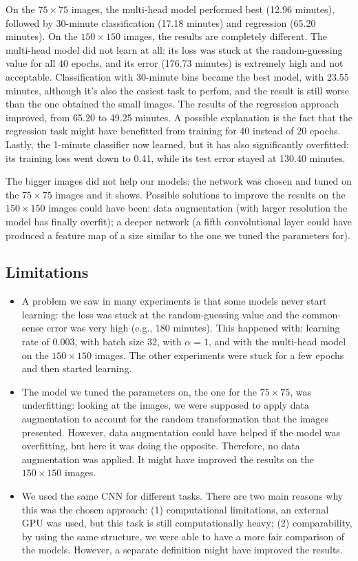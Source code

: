 \documentclass[a4paper]{article}
\begin{document}
On the \(75\times75\) images, the multi-head model performed best (12.96 minutes), followed by 30-minute classification (17.18 minutes) and regression (65.20 minutes). On the \(150\times150\) images, the results are completely different. The multi-head model did not learn at all: its loss was stuck at the random-guessing value for all 40 epochs, and its error (176.73 minutes) is extremely high and not acceptable. Classification with 30-minute bins became the best model, with 23.55 minutes, although it's also the easiest task to perfom, and the result is still worse than the one obtained the small images. The results of the regression approach improved, from 65.20 to 49.25 minutes. A possible explanation is the fact that the regression task might have benefitted from training for 40 instead of 20 epochs. Lastly, the 1-minute classifier now learned, but it has also significantly overfitted: its training loss went down to 0.41, while its test error stayed at 130.40 minutes.
 
The bigger images did not help our models: the network was chosen and tuned on the \(75\times75\) images and it shows. Possible solutions to improve the results on the \(150\times150\) images could have been: data augmentation (with larger resolution the model has finally overfit); a deeper network (a fifth convolutional layer could have produced a feature map of a size similar to the one we tuned the parameters for).
 
\subsection{Limitations}\label{sec:limitations}

\begin{itemize}
    \item A problem we saw in many experiments is that some models never start learning: the loss was stuck at the random-guessing value and the common-sense error was very high (e.g., 180 minutes). This happened with: learning rate of 0.003, with batch size 32, with \(\alpha = 1\), and with the multi-head model on the \(150\times150\) images. The other experiments were stuck for a few epochs and then started learning. 
    \item The model we tuned the parameters on, the one for the \(75\times75\), was underfitting: looking at the images, we were supposed to apply data augmentation to account for the random transformation that the images presented. However, data augmentation could have helped if the model was overfitting, but here it was doing the opposite. Therefore, no data augmentation was applied. It might have improved the results on the \(150\times150\) images.
    \item We used the same CNN for different tasks. There are two main reasons why this was the chosen approach: (1) computational limitations, an external GPU was used, but this task is still computationally heavy; (2) comparability, by using the same structure, we were able to have a more fair comparison of the models. However, a separate definition might have improved the results. 

\end{itemize}
\end{document}
